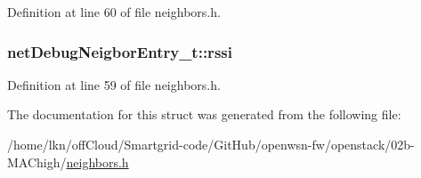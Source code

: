 Definition at line 60 of file neighbors.\+h.

\subsubsection[{\texorpdfstring{rssi}{rssi}}]{ net\+Debug\+Neigbor\+Entry\+\_\+t\+::rssi}\hypertarget{structnet_debug_neigbor_entry__t_a60fc35dde6926b216d6458b59416aa40}{}\label{structnet_debug_neigbor_entry__t_a60fc35dde6926b216d6458b59416aa40}


Definition at line 59 of file neighbors.\+h.



The documentation for this struct was generated from the following file\+:\begin{DoxyCompactItemize}
\item 
/home/lkn/off\+Cloud/\+Smartgrid-\/code/\+Git\+Hub/openwsn-\/fw/openstack/02b-\/\+M\+A\+Chigh/\hyperlink{neighbors_8h}{neighbors.\+h}\end{DoxyCompactItemize}
